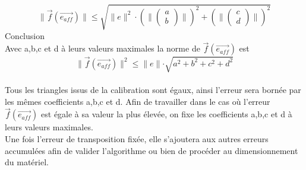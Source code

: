 \documentclass[a4paper, 12pt]{report}
\begin{document}
$$ \parallel \overrightarrow{f}(\overrightarrow{e_{aff}}) \parallel \le \sqrt{\parallel e \parallel ^{2} \cdot( \parallel \left(\begin{array}{c}a \\ b \end{array} \right) \parallel ) ^{2} + ( \parallel \left(\begin{array}{c}c \\ d \end{array} \right) \parallel) ^{2}}$$
Conclusion \\
Avec a,b,c et d à leurs valeurs maximales la norme de $\overrightarrow{f}(\overrightarrow{e_{aff}})$ est \\
$$ \parallel \overrightarrow{f}(\overrightarrow{e_{aff}}) \parallel ^{2} \le \parallel e \parallel \cdot \sqrt{a^{2} + b^{2} + c^{2} + d^{2}} $$ \\
Tous les triangles issus de la calibration sont égaux, ainsi l'erreur sera bornée par les mêmes coefficients a,b,c et d. Afin de travailler dans le cas où l'erreur $\overrightarrow{f}(\overrightarrow{e_{aff}})$ est égale à sa valeur la plus élevée, on fixe les coefficients a,b,c et d à leurs valeurs maximales. \\
Une fois l'erreur de transposition fixée, elle s'ajoutera aux autres erreurs accumulées afin de valider l'algorithme ou bien de procéder au dimensionnement du matériel.
\end{document}
